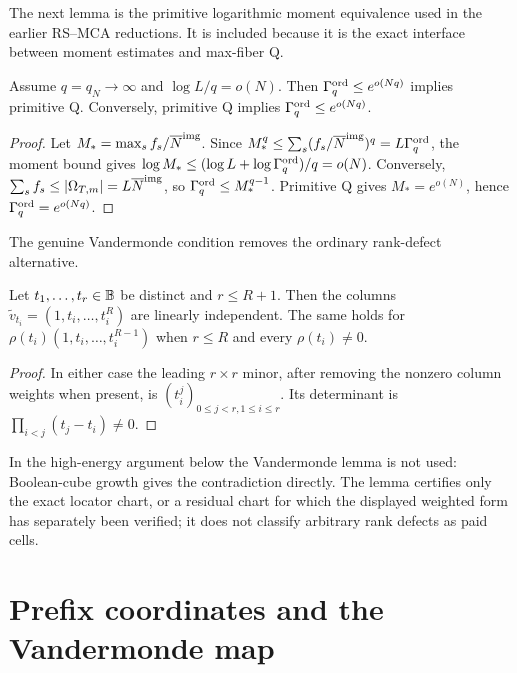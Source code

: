 \documentclass[11pt,a4paper]{amsart}
\numberwithin{equation}{section}
\theoremstyle{remark}
\begin{document}
The next lemma is the primitive logarithmic moment equivalence used in the earlier RS--MCA reductions.  It is included because it is the exact interface between moment estimates and max-fiber Q.

\begin{lemma}\label{lem:logmoment-q}
Assume \(q=q_N\to\infty\) and \(\log L/q=o(N)\).  Then
\(\Gamma^{\rm ord}_q\le e^{o(Nq)}\) implies primitive Q.  Conversely, primitive Q
implies \(\Gamma^{\rm ord}_q\le e^{o(Nq)}\).
\end{lemma}

\begin{proof}
Let \(M_*=\max_s f_s/\overline N^{\rm img}\).  Since
\(M_*^q\le\sum_s(f_s/\overline N^{\rm img})^q=L\Gamma^{\rm ord}_q\), the moment bound gives
\(\log M_*\le(\log L+\log\Gamma^{\rm ord}_q)/q=o(N)\).  Conversely,
\(\sum_sf_s\le\lvert \Omega_{T,m}\rvert=L\overline N^{\rm img}\), so
\(\Gamma^{\rm ord}_q\le M_*^{q-1}\).  Primitive Q gives \(M_*=e^{o(N)}\), hence
\(\Gamma^{\rm ord}_q=e^{o(Nq)}\).
\end{proof}

The genuine Vandermonde condition removes the ordinary rank-defect alternative.

\begin{lemma}\label{lem:vandermonde}
Let \(t_1,\ldots,t_r\in\mathbb B\) be distinct and \(r\le R+1\).  Then the
columns \(\widetilde v_{t_i}=(1,t_i,\ldots,t_i^R)\) are linearly
independent.  The same holds for \(\rho(t_i)(1,t_i,\ldots,t_i^{R-1})\)
when \(r\le R\) and every \(\rho(t_i)\ne0\).
\end{lemma}

\begin{proof}
In either case the leading \(r\times r\) minor, after removing the nonzero
column weights when present, is \((t_i^j)_{0\le j<r,1\le i\le r}\).  Its
determinant is \(\prod_{i<j}(t_j-t_i)\ne0\).
\end{proof}

In the high-energy argument below the Vandermonde lemma is not used:
Boolean-cube growth gives the contradiction directly.  The lemma certifies
only the exact locator chart, or a residual chart for which the displayed
weighted form has separately been verified; it does not classify arbitrary
rank defects as paid cells.


\section{Prefix coordinates and the Vandermonde map}\label{sec:prefix-coordinates}
\end{document}
